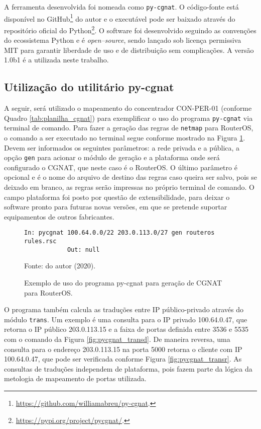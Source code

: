     A ferramenta desenvolvida foi nomeada como {\tt py-cgnat}. O código-fonte está disponível no GitHub\footnote{\url{https://github.com/williamabreu/py-cgnat}.} do autor e o executável pode ser baixado através do repositório oficial do Python\footnote{\url{https://pypi.org/project/pycgnat/}.}. O software foi desenvolvido seguindo as convenções do ecossistema Python e é \textit{open--source}, sendo lançado sob licença permissiva MIT para garantir liberdade de uso e de distribuição sem complicações. A versão 1.0b1 é a utilizada neste trabalho.
    
    
\subsection{Utilização do utilitário py-cgnat}
    
    A seguir, será utilizado o mapeamento do concentrador CON-PER-01 (conforme Quadro \ref{tab:planilha_cgnat}) para exemplificar o uso do programa {\tt py-cgnat} via terminal de comando. Para fazer a geração das regras de {\tt netmap} para RouterOS, o comando a ser executado no terminal segue conforme mostrado na Figura \ref{fig:pycgnat_gen}. Devem ser informados os seguintes parâmetros: a rede privada e a pública, a opção {\tt gen} para acionar o módulo de geração e a plataforma onde será configurado o CGNAT, que neste caso é o RouterOS. O último parâmetro é opcional e é o nome do arquivo de destino das regras caso queira ser salvo, pois se deixado em branco, as regras serão impressas no próprio terminal de comando. O campo plataforma foi posto por questão de extensibilidade, para deixar o software pronto para futuras novas versões, em que se pretende suportar equipamentos de outros fabricantes.
    
    \begin{figure}[!htb]
        \centering
        \caption{Exemplo de uso do programa py-cgnat para geração de CGNAT para RouterOS.} 
        \label{fig:pycgnat_gen}
        
        \begin{Verbatim}[fontsize=\small]
            In: pycgnat 100.64.0.0/22 203.0.113.0/27 gen routeros rules.rsc
            Out: null
        \end{Verbatim} 

        {\small Fonte: do autor (2020).} 
    \end{figure}
    
    O programa também calcula as traduções entre IP público-privado através do módulo {\tt trans}. Um exemplo é uma consulta para o IP privado 100.64.0.47, que retorna o IP público 203.0.113.15 e a faixa de portas definida entre 3536 e 5535 com o comando da Figura \ref{fig:pycgnat_transd}. De maneira reversa, uma consulta para o endereço 203.0.113.15 na porta 5000 retorna o cliente com IP 100.64.0.47, que pode ser verificada conforme Figura \ref{fig:pycgnat_transr}. As consultas de traduções independem de plataforma, pois fazem parte da lógica da metologia de mapeamento de portas utilizada. 
    
